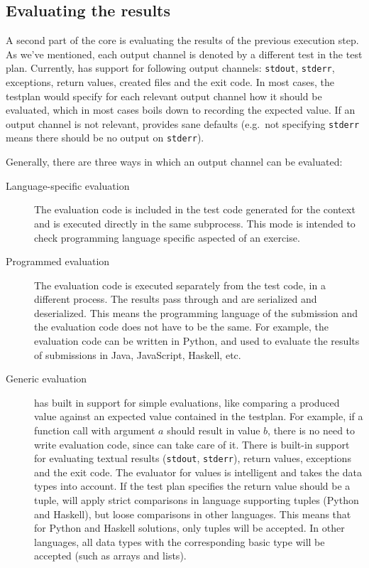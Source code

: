 \documentclass[5p,number]{elsarticle}
\begin{document}
    \subsection{Evaluating the results}\label{subsec:evaluating-the-results}
    
    A second part of the core is evaluating the results of the previous execution step.
    As we've mentioned, each output channel is denoted by a different test in the test plan.
    Currently, \tested{} has support for following output channels: \texttt{stdout}, \texttt{stderr}, exceptions, return values, created files and the exit code.
    In most cases, the testplan would specify for each relevant output channel how it should be evaluated, which in most cases boils down to recording the expected value.
    If an output channel is not relevant, \tested{} provides sane defaults (e.g.\ not specifying \texttt{stderr} means there should be no output on \texttt{stderr}).

    Generally, there are three ways in which an output channel can be evaluated:
    \begin{description}
        \item[Language-specific evaluation] The evaluation code is included in the test code generated for the context and is executed directly in the same subprocess.
        This mode is intended to check programming language specific aspected of an exercise.
        \item[Programmed evaluation] The evaluation code is executed separately from the test code, in a different process.
        The results pass through \tested{} and are serialized and deserialized.
        This means the programming language of the submission and the evaluation code does not have to be the same.
        For example, the evaluation code can be written in Python, and used to evaluate the results of submissions in Java, JavaScript, Haskell, etc.
        \item[Generic evaluation] \tested{} has built in support for simple evaluations, like comparing a produced value against an expected value contained in the testplan.
        For example, if a function call with argument $a$ should result in value $b$, there is no need to write evaluation code, since \tested{} can take care of it.
        There is built-in support for evaluating textual results (\texttt{stdout}, \texttt{stderr}), return values, exceptions and the exit code.
        The evaluator for values is intelligent and takes the data types into account.
        If the test plan specifies the return value should be a tuple, \tested{} will apply strict comparisons in language supporting tuples (Python and Haskell), but loose comparisons in other languages.
        This means that for Python and Haskell solutions, only tuples will be accepted.
        In other languages, all data types with the corresponding basic type will be accepted (such as arrays and lists).
    \end{description}
\end{document}

